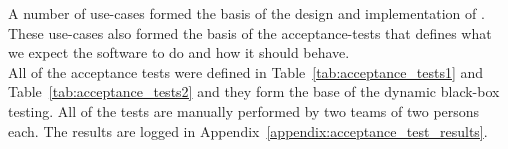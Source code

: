 A number of use-cases formed the basis of the design and implementation of \projectname{}.
These use-cases also formed the basis of the acceptance-tests that defines what we expect the software to do and how it should behave. \\

All of the acceptance tests were defined in Table~\ref{tab:acceptance_tests1} and Table~\ref{tab:acceptance_tests2} and they form the base of the dynamic black-box testing.
All of the tests are manually performed by two teams of two persons each.
The results are logged in Appendix~\ref{appendix:acceptance_test_results}. \\


